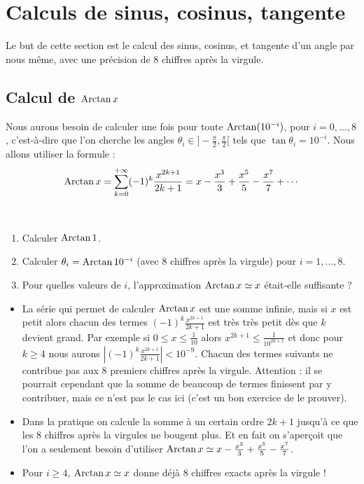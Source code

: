 \documentclass[class=report,crop=false]{standalone}
\begin{document}
\section{Calculs de sinus, cosinus, tangente}

Le but de cette section est le calcul des sinus, cosinus, et tangente d'un angle par nous même,
avec une précision de $8$ chiffres après la virgule.


\subsection{Calcul de $\mathop{\mathrm{Arctan}}\nolimits x$}


Nous aurons besoin de calculer une fois pour toute $\mathop{\mathrm{Arctan}}\nolimits (10^{-i})$, pour $i=0,\ldots,8$,
c'est-à-dire que l'on cherche les angles $\theta_i\in ]-\frac\pi2,\frac\pi2[$ tels que $\tan \theta_i = 10^{-i}$.
Nous allons utiliser la formule :
$$\mathop{\mathrm{Arctan}}\nolimits x = \sum_{k=0}^{+\infty} (-1)^k\frac{x^{2k+1}}{2k+1} = x - \frac{x^3}{3}+ \frac{x^5}{5}-\frac{x^7}{7}+\cdots$$

\begin{tp}~
\begin{enumerate}
  \item Calculer $\mathop{\mathrm{Arctan}}\nolimits 1$.
  \item Calculer $\theta_i = \mathop{\mathrm{Arctan}}\nolimits 10^{-i}$ (avec $8$ chiffres après la virgule) pour $i =1,\ldots,8$.
  \item Pour quelles valeurs de $i$, l'approximation $\mathop{\mathrm{Arctan}}\nolimits x \simeq x$ était-elle suffisante ?
\end{enumerate}
\end{tp}


\begin{itemize}
  \item La série qui permet de calculer $\mathop{\mathrm{Arctan}}\nolimits x$ est une somme infinie, mais
si $x$ est petit alors chacun des termes $(-1)^k\frac{x^{2k+1}}{2k+1}$ est très très petit
dès que $k$ devient grand. Par exemple si $0 \le x \le \frac 1{10}$ alors
$x^{2k+1} \le \frac{1}{10^{2k+1}}$ et donc pour $k \ge 4$ nous aurons $\left| (-1)^k\frac{x^{2k+1}}{2k+1}
\right| < 10^{-9}$. Chacun des termes suivants ne contribue pas aux $8$ premiers chiffres après la virgule.
Attention : il se pourrait cependant que la somme de beaucoup de termes finissent par y contribuer,
mais ce n'est pas le cas ici (c'est un bon exercice de le prouver).

  \item Dans la pratique on calcule la somme à un certain ordre $2k+1$ jusqu'à ce que les $8$
  chiffres après la virgules ne bougent plus.
  Et en fait on s'aperçoit que l'on a seulement besoin d'utiliser $\mathop{\mathrm{Arctan}}\nolimits x \simeq  x - \frac{x^3}{3}+ \frac{x^5}{5}-\frac{x^7}{7}$.

  \item Pour $i \ge 4$, $\mathop{\mathrm{Arctan}}\nolimits x \simeq x$ donne déjà $8$ chiffres exacts après la virgule !
\end{itemize}
\end{document}
